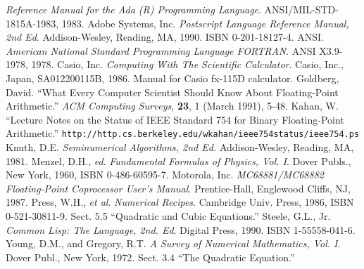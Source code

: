 \documentclass[twocolumn,epsf]{snBaker}
\begin{document}
\begin{thebibliography}{7}
{\it Reference Manual for the Ada (R) Programming Language}.
ANSI/MIL-STD-1815A-1983, 1983.
%
Adobe Systems, Inc.  {\it Postscript Language Reference Manual, 2nd
Ed}.  Addison-Wesley, Reading, MA, 1990.  ISBN 0-201-18127-4.
%
ANSI.  {\it American National Standard Programming Language FORTRAN}.
ANSI X3.9-1978, 1978.
%
Casio, Inc.  {\it Computing With The Scientific Calculator}.  Casio,
Inc., Japan, SA012200115B, 1986.  Manual for Casio fx-115D calculator.
%
Goldberg, David.  ``What Every Computer Scientist Should Know About
Floating-Point Arithmetic.''  {\it ACM Computing Surveys}, {\bf 23}, 1
(March 1991), 5-48.
%
Kahan, W.  ``Lecture Notes on the Status of IEEE Standard 754 for Binary Floating-Point
Arithmetic.''  {\tiny\tt http://http.cs.berkeley.edu/{\mytilde}wkahan/ieee754status/ieee754.ps}
%
Knuth, D.E.  {\it Seminumerical Algorithms, 2nd Ed.}  Addison-Wesley, Reading, MA, 1981.
%
Menzel, D.H., {\it ed}.  {\it Fundamental Formulas of Physics, Vol. I}.
Dover Publs., New York, 1960, ISBN 0-486-60595-7.
%
Motorola, Inc.  {\it MC68881/MC68882 Floating-Point Coprocessor User's
Manual}.  Prentice-Hall, Englewood Cliffs, NJ, 1987.
%
Press, W.H., {\it et al}.  {\it Numerical Recipes}.  Cambridge Univ.
Press, 1986, ISBN 0-521-30811-9.  Sect. 5.5 ``Quadratic and Cubic Equations.''
%
Steele, G.L., Jr.  {\it Common Lisp: The Language, 2nd. Ed}.  Digital
Press, 1990.  ISBN 1-55558-041-6.
%
Young, D.M., and Gregory, R.T.  {\it A Survey of Numerical
Mathematics, Vol. I}.  Dover Publ., New York, 1972.  Sect. 3.4 ``The Quadratic Equation.''
%
\end{thebibliography}


\SpewBio
\end{document}
